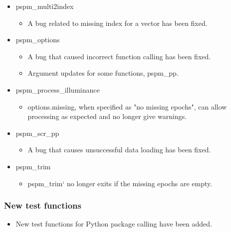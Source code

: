 \documentclass[english]{article}
\numberwithin{equation}{section}
\numberwithin{figure}{section}
\begin{document}
\begin{itemize}
\begin{itemize}
\item Duplicated path removal has been removed.
\end{itemize}

\item pspm\_multi2index

\begin{itemize}
\item A bug related to missing index for a vector has been fixed.
\end{itemize}

\item pspm\_options

\begin{itemize}
\item A bug that caused incorrect function calling has been fixed.

\item Argument updates for some functions, pspm\_pp.
\end{itemize}

\item pspm\_process\_illuminance

\begin{itemize}
\item options.missing, when specified as "no missing epochs", can allow processing as expected and no longer give warnings.
\end{itemize}

\item pspm\_scr\_pp

\begin{itemize}
\item A bug that causes unsuccessful data loading has been fixed.
\end{itemize}

\item pspm\_trim
\begin{itemize}
\item pspm\_trim` no longer exits if the missing epochs are empty.
\end{itemize}
\end{itemize}
\subsubsection*{New test functions}
\begin{itemize}
\item New test functions for Python package calling have been added.
\end{itemize}
\end{document}
